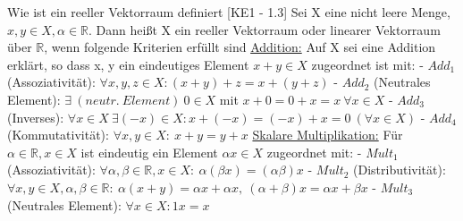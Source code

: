 \documentclass[a6paper
	,10pt
	,grid=none
]{kartei}
\begin{document}
\begin{karte}
	[Vektorraum]
	{
		Wie ist ein reeller Vektorraum definiert
	}
	[KE1 - 1.3]
	{
		Sei X eine nicht leere Menge,  $x,y \in X, \alpha\in \mathbb{R}$. Dann heißt X ein reeller Vektorraum oder linearer Vektorraum über $\mathbb{R}$, wenn folgende Kriterien erfüllt sind \newline\newline
		\underline{Addition:} Auf X sei eine Addition erklärt, so dass x, y ein eindeutiges Element $x+y \in X$ zugeordnet ist mit:
		\newline
		- $Add_1$ (Assoziativität): $\forall x, y, z \in X: (x+y)+z =x+(y+z)$ \newline
		- $Add_2$ (Neutrales Element): $\exists \ (neutr.\ Element)\ 0 \in X$ mit $x+0=0+x=x\ \forall x\in X$\newline
		- $Add_3$ (Inverses): $\forall x\in X \ \exists (-x)\in X: x+(-x) =(-x)+x = 0\ (\forall x \in X)$\newline
		- $Add_4$ (Kommutativität): $\forall x, y \in X:\ x+y = y+x$
		\newline\newline
		\underline{Skalare Multiplikation:} Für $\alpha\in\mathbb{R}, x\in X$ ist eindeutig ein Element $\alpha x \in X$ zugeordnet mit:
		\newline
		- $Mult_1$ (Assoziativität): $\forall \alpha, \beta \in \mathbb{R}, x\in X: \ \alpha (\beta x) = (\alpha\beta)x$ \newline
		- $Mult_2$ (Distributivität): $\forall x, y \in X, \alpha, \beta \in \mathbb{R}: \ \alpha(x+y)=\alpha x + \alpha x,\ (\alpha + \beta)x=\alpha x + \beta x$
		- $Mult_3$ (Neutrales Element): $\forall x\in X: 1x=x$		
	}
\end{karte}
\end{document}
